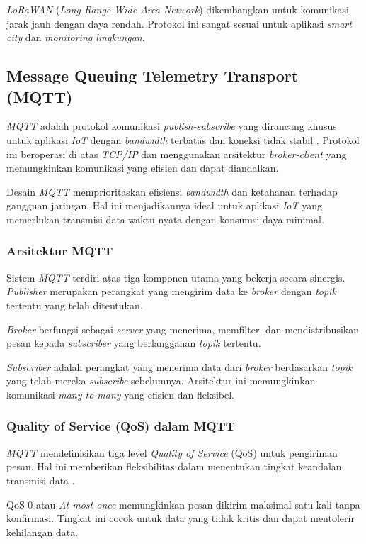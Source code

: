 \textit{LoRaWAN} (\textit{Long Range Wide Area Network}) dikembangkan untuk komunikasi jarak jauh dengan daya rendah. Protokol ini sangat sesuai untuk aplikasi \textit{smart city} dan \textit{monitoring lingkungan}.

\subsection{Message Queuing Telemetry Transport (MQTT)}
\textit{MQTT} adalah protokol komunikasi \textit{publish-subscribe} yang dirancang khusus untuk aplikasi \textit{IoT} dengan \textit{bandwidth} terbatas dan koneksi tidak stabil \citep{zhang2021iot}. Protokol ini beroperasi di atas \textit{TCP/IP} dan menggunakan arsitektur \textit{broker-client} yang memungkinkan komunikasi yang efisien dan dapat diandalkan. 

Desain \textit{MQTT} memprioritaskan efisiensi \textit{bandwidth} dan ketahanan terhadap gangguan jaringan. Hal ini menjadikannya ideal untuk aplikasi \textit{IoT} yang memerlukan transmisi data waktu nyata dengan konsumsi daya minimal.

\subsubsection{Arsitektur MQTT}
Sistem \textit{MQTT} terdiri atas tiga komponen utama yang bekerja secara sinergis. \textit{Publisher} merupakan perangkat yang mengirim data ke \textit{broker} dengan \textit{topik} tertentu yang telah ditentukan. 

\textit{Broker} berfungsi sebagai \textit{server} yang menerima, memfilter, dan mendistribusikan pesan kepada \textit{subscriber} yang berlangganan \textit{topik} tertentu. 

\textit{Subscriber} adalah perangkat yang menerima data dari \textit{broker} berdasarkan \textit{topik} yang telah mereka \textit{subscribe} sebelumnya. Arsitektur ini memungkinkan komunikasi \textit{many-to-many} yang efisien dan fleksibel.

\subsubsection{Quality of Service (QoS) dalam MQTT}
\textit{MQTT} mendefinisikan tiga level \textit{Quality of Service} (QoS) untuk pengiriman pesan. Hal ini memberikan fleksibilitas dalam menentukan tingkat keandalan transmisi data \citep{anderson2019digital}. 

QoS 0 atau \textit{At most once} memungkinkan pesan dikirim maksimal satu kali tanpa konfirmasi. Tingkat ini cocok untuk data yang tidak kritis dan dapat mentolerir kehilangan data. 

